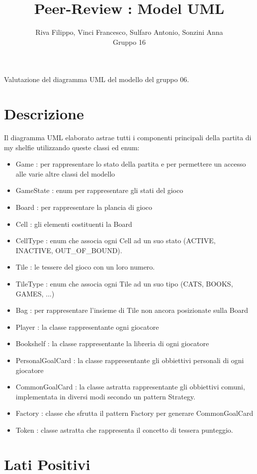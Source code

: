 \documentclass[12pt]{article}
\title{Peer-Review : Model UML}
\author{Riva Filippo, Vinci Francesco, Sulfaro Antonio, Sonzini Anna\\Gruppo 16}
\begin{document}
\maketitle

Valutazione del diagramma UML del modello del gruppo 06.

\section{Descrizione}

Il diagramma UML elaborato astrae tutti i componenti principali della partita di my shelfie utilizzando queste classi ed enum: 
\begin{itemize}
    \item Game : per rappresentare lo stato della partita e per permettere un accesso alle varie altre classi del modello
    \item GameState : enum per rappresentare gli stati del gioco 
    \item Board : per rappresentare la plancia di gioco 
    \item Cell : gli elementi costituenti la Board 
    \item CellType : enum che associa ogni Cell ad un suo stato (ACTIVE, INACTIVE, OUT\_OF\_BOUND).
    \item Tile : le tessere del gioco con un loro numero.
    \item TileType : enum che associa ogni Tile ad un suo tipo (CATS, BOOKS, GAMES, ...)
    \item Bag : per rappresentare l'insieme di Tile non ancora posizionate sulla Board
    \item Player : la classe rappresentante ogni giocatore 
    \item Bookshelf : la classe rappresentante la libreria di ogni giocatore
    \item PersonalGoalCard : la classe rappresentante gli obbiettivi personali di ogni giocatore
    \item CommonGoalCard : la classe astratta rappresentante gli obbiettivi comuni, implementata in diversi modi secondo un pattern Strategy. 
    \item Factory : classe che sfrutta il pattern Factory per generare CommonGoalCard
    \item Token : classe astratta che rappresenta il concetto di tessera punteggio.
\end{itemize}

\section{Lati Positivi}
\end{document}
